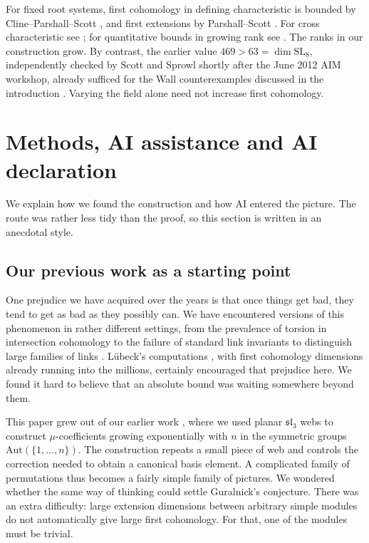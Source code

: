 \documentclass[a4paper,11pt]{amsart}
\numberwithin{equation}{subsection}
\theoremstyle{plain}
\theoremstyle{definition}
\theoremstyle{remark}
\begin{document}
For fixed root systems, first cohomology in defining
characteristic is bounded by Cline--Parshall--Scott \cite{CPS},
and first extensions by Parshall--Scott \cite{ParshallScott}.
For cross characteristic see \cite{GuralnickTiep,GuralnickTiepSectional};
for quantitative bounds in growing rank see \cite{ParkerStewart}.
The ranks in our construction grow. By contrast, the earlier
value $469>63=\dim\mathrm{SL}_8$, independently checked by Scott
and Sprowl shortly after the June 2012 AIM workshop, already sufficed for
the Wall counterexamples discussed in the introduction
\cite{AIMWall,Luebeck}. Varying the field alone need not increase
first cohomology.

\section{Methods, AI assistance and AI declaration}

We explain how we found the construction and how AI entered the picture. The route was rather less tidy than the proof, so this section is written in an anecdotal style.

\subsection{Our previous work as a starting point}

One prejudice we have acquired over the years is that once
things get bad, they tend to get as bad as they possibly can.
We have encountered versions of this phenomenon in rather
different settings, from the prevalence of torsion in
intersection cohomology \cite{TorsionProliferation} to the
failure of standard link invariants to distinguish large
families of links \cite{LinkDetection}.
L\"ubeck's computations \cite{Luebeck}, with first cohomology
dimensions already running into the millions, certainly
encouraged that prejudice here. We found it hard to believe
that an absolute bound was waiting somewhere beyond them.

This paper grew out of our earlier work \cite{Finite}, where
we used planar $\mathfrak{sl}_3$ webs to construct
$\mu$-coefficients growing exponentially with $n$ in
the symmetric groups $\mathrm{Aut}(\{1,\dots,n\})$. The construction repeats a small piece
of web and controls the correction needed to obtain a
canonical basis element. A complicated family of permutations
thus becomes a fairly simple family of pictures.
We wondered whether the same way of thinking could settle
Guralnick's conjecture. There was an extra difficulty:
large extension dimensions between arbitrary simple modules
do not automatically give large first cohomology. For that,
one of the modules must be trivial.
\end{document}
